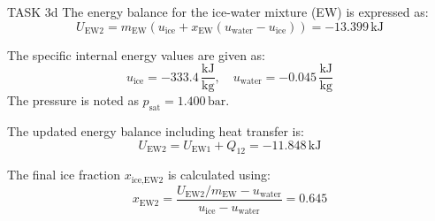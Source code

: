 TASK 3d  
The energy balance for the ice-water mixture (EW) is expressed as:  
\[
U_{\text{EW2}} = m_{\text{EW}} \left( u_{\text{ice}} + x_{\text{EW}} \left( u_{\text{water}} - u_{\text{ice}} \right) \right) = -13.399 \, \text{kJ}
\]  

The specific internal energy values are given as:  
\[
u_{\text{ice}} = -333.4 \, \frac{\text{kJ}}{\text{kg}}, \quad u_{\text{water}} = -0.045 \, \frac{\text{kJ}}{\text{kg}}
\]  
The pressure is noted as \( p_{\text{sat}} = 1.400 \, \text{bar} \).  

The updated energy balance including heat transfer is:  
\[
U_{\text{EW2}} = U_{\text{EW1}} + Q_{12} = -11.848 \, \text{kJ}
\]  

The final ice fraction \( x_{\text{ice,EW2}} \) is calculated using:  
\[
x_{\text{EW2}} = \frac{U_{\text{EW2}} / m_{\text{EW}} - u_{\text{water}}}{u_{\text{ice}} - u_{\text{water}}} = 0.645
\]